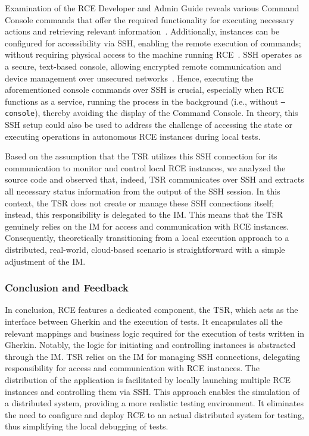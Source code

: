 Examination of the \ac{RCE} Developer and Admin Guide reveals various Command Console commands that offer the required functionality for executing necessary actions and retrieving relevant information~\cite{rceDevGuide10x}. Additionally, instances can be configured for accessibility via \ac{SSH}, enabling the remote execution of commands; without requiring physical access to the machine running RCE~\cite{rceDevGuide10x}. \ac{SSH} operates as a secure, text-based console, allowing encrypted remote communication and device management over unsecured networks~\cite{Schwenk2022}. Hence, executing the aforementioned console commands over \ac{SSH} is crucial, especially when \ac{RCE} functions as a service, running the process in the background (i.e., without \texttt{--console}), thereby avoiding the display of the Command Console. In theory, this \ac{SSH} setup could also be used to address the challenge of accessing the state or executing operations in autonomous \ac{RCE} instances during local tests.

Based on the assumption that the \ac{TSR} utilizes this \ac{SSH} connection for its communication to monitor and control local \ac{RCE} instances, we analyzed the source code and observed that, indeed, \ac{TSR} communicates over \ac{SSH} and extracts all necessary status information from the output of the \ac{SSH} session. In this context, the \ac{TSR} does not create or manage these \ac{SSH} connections itself; instead, this responsibility is delegated to the \ac{IM}. This means that the \ac{TSR} genuinely relies on the \ac{IM} for access and communication with \ac{RCE} instances. Consequently, theoretically transitioning from a local execution approach to a distributed, real-world, cloud-based scenario is straightforward with a simple adjustment of the \ac{IM}.

\subsubsection{Conclusion and Feedback}
In conclusion, RCE features a dedicated component, the \acf{TSR}, which acts as the interface between Gherkin and the execution of tests. It encapsulates all the relevant mappings and business logic required for the execution of tests written in Gherkin. Notably, the logic for initiating and controlling instances is abstracted through the \acf{IM}. \ac{TSR} relies on the \ac{IM} for managing \ac{SSH} connections, delegating responsibility for access and communication with RCE instances. The distribution of the application is facilitated by locally launching multiple RCE instances and controlling them via \ac{SSH}. This approach enables the simulation of a distributed system, providing a more realistic testing environment. It eliminates the need to configure and deploy RCE to an actual distributed system for testing, thus simplifying the local debugging of tests.

